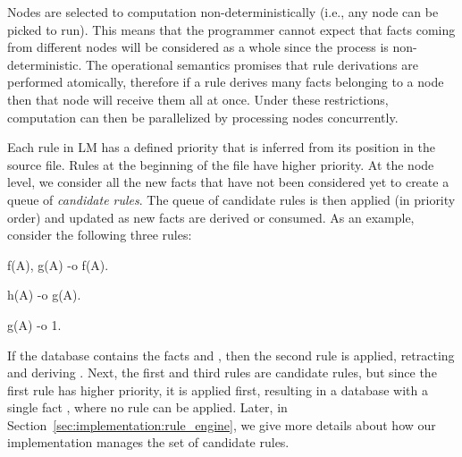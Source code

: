 
Nodes are selected to computation non-deterministically (i.e., any node can be
picked to run). This means that the programmer cannot expect that facts coming
from different nodes will be considered as a whole since the process is
non-deterministic. The operational semantics promises that rule derivations are
performed atomically, therefore if a rule derives many facts belonging to a node
then that node will receive them all at once. Under these restrictions,
computation can then be parallelized by processing nodes concurrently.

Each rule in LM has a defined priority that is inferred from its position in the
source file. Rules at the beginning of the file have higher priority. At the
node level, we consider all the new facts that have not been considered yet to
create a queue of \emph{candidate rules}. The queue of candidate rules
is then applied (in priority order) and updated as new facts are derived or
consumed. As an example, consider the following three rules:

\begin{Code}
f(A), g(A) -o f(A).

h(A) -o g(A).

g(A) -o 1.
\end{Code}

If the database contains the facts  and , then the
second rule is applied, retracting  and deriving . Next,
the first and third rules are candidate rules, but since the first rule has
higher priority, it is applied first, resulting in a database with a single fact
, where no rule can be applied. Later, in
Section~\ref{sec:implementation:rule_engine}, we give more details about how our
implementation manages the set of candidate rules.

